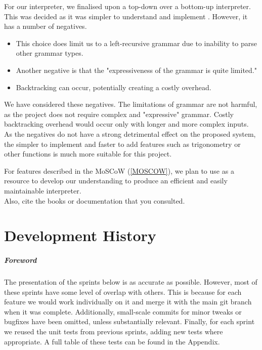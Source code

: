 \documentclass[a4paper, oneside, 11pt]{report}
\begin{document}
    For our interpreter, we finalised upon a top-down over a bottom-up interpreter. This was decided as it was simpler to understand and implement \citep{Top-DownInterpreter}. However, it has a number of negatives.
    \begin{itemize}
        \item This choice does limit us to a left-recursive grammar due to inability to parse other grammar types.
        \item Another negative is that the "expressiveness of the grammar is quite limited."
        \item Backtracking can occur, potentially creating a costly overhead.
    \end{itemize}
    We have considered these negatives. The limitations of grammar are not harmful, as the project does not require complex and "expressive" grammar. Costly backtracking overhead would occur only with longer and more complex inputs. As the negatives do not have a strong detrimental effect on the proposed system, the simpler to implement and faster to add features such as trigonometry or other functions is much more suitable for this project.

    For features described in the MoSCoW (\ref{MOSCOW}), we plan to use \citet{Nystrom:2021} as a resource to develop our understanding to produce an efficient and easily maintainable interpreter. \\


    Also, cite the books \citep{Nystrom:2021} or documentation \citep{WPF:2023} that you consulted.
    \chapter{Development History}\label{Chap:DevHist}


    \paragraph{Foreword} The presentation of the sprints below is as accurate as possible. However, most of these sprints have some level of overlap with others. This is because for each feature we would work individually on it and merge it with the main git branch when it was complete. Additionally, small-scale commits for minor tweaks or bugfixes have been omitted, unless substantially relevant. Finally, for each sprint we reused the unit tests from previous sprints, adding new tests where appropriate. A full table of these tests can be found in the Appendix.
\end{document}
